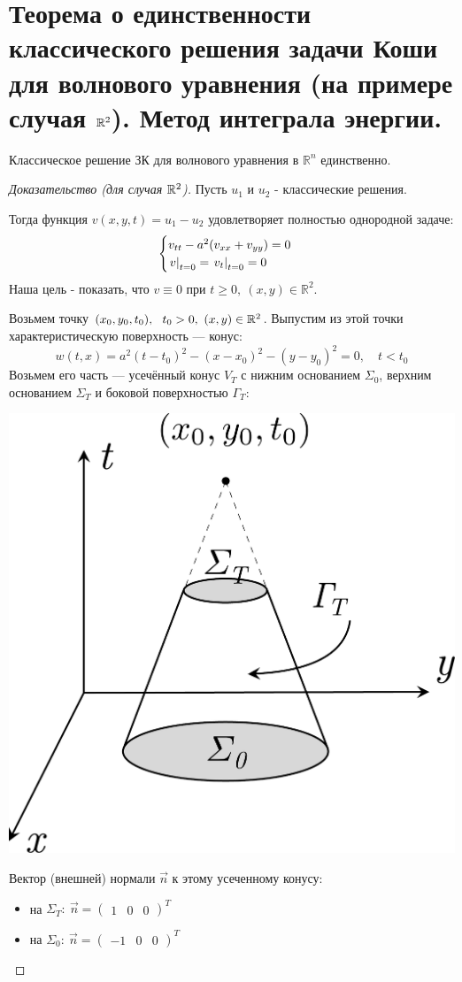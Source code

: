 \documentclass[../main.tex]{subfiles}
\begin{document}
\section[Теорема единственности для волнового уравнения]{Теорема о единственности классического решения задачи Коши для волнового уравнения (на примере случая $\mathbb{R}^2$). Метод интеграла энергии.}


\begin{theorem} Классическое решение ЗК для волнового уравнения в $\mathbb{R}^n$ единственно.
\end{theorem}
\begin{proof}[Доказательство (для случая $\mathbb{R}^2$)]
Пусть $u_{1}$ и $u_{2}$ - классические решения.

Тогда функция $v(x,y,t) = u_1 - u_2$ удовлетворяет полностью однородной задаче: 
$$
\begin{cases}
  v_{tt} - a^2(v_{xx} + v_{yy}) = 0\\
  \left. v\right|_{t=0} = \left. v_t\right|_{t=0} = 0
\end{cases}
$$
Наша цель - показать, что $v\equiv 0 $ при $ t\geq 0,\ (x,y) \in \mathbb{R}^2$.

Возьмем точку $ (x_0, y_0, t_0),\ \ t_0 > 0,\ (x,y) \in \mathbb{R}^2$. \; Выпустим из этой точки характеристическую поверхность --- конус:
$$ 
w(t,x) = a^2(t - t_0)^2 - (x - x_0)^2 - (y - y_0)^2 = 0,\quad t < t_0
$$
Возьмем его часть --- усечённый конус $ V_T $ с нижним основанием $ \Sigma_0 $, верхним основанием $ \Sigma_T $  и боковой поверхностью $ \Gamma_T:$
\begin{center}
\includegraphics[width=0.28\linewidth]{./pic 8.pdf}
\end{center}
Вектор (внешней) нормали $ \vec{n} $ к этому усеченному конусу:
\begin{itemize}
	\item на $\Sigma_T:\ \vec{n} = \begin{pmatrix}1 & 0 & 0\end{pmatrix}^T $
	
	\item на $\Sigma_0:\ \vec{n} = \begin{pmatrix}-1 & 0 & 0\end{pmatrix}^T $
	

\end{itemize}
\end{proof}
\end{document}

